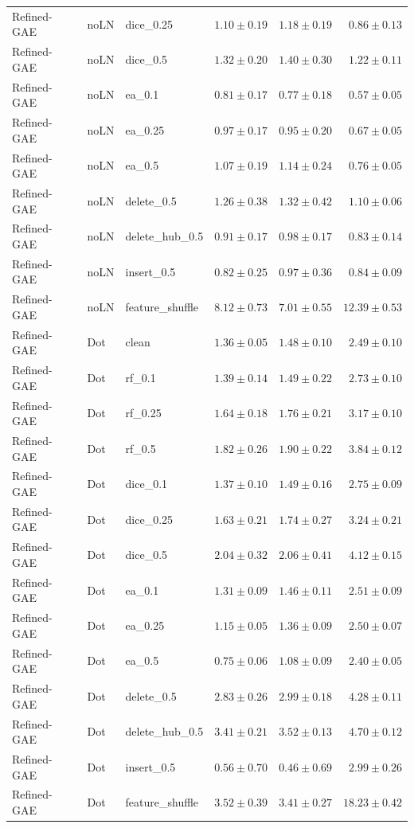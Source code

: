 \documentclass[UTF8,a4paper,11pt,fontset=fandol]{ctexart}
\begin{document}
{\begin{longtable}{lllrrr}
Refined-GAE & noLN & dice\_0.25 & $1.10\pm0.19$ & $1.18\pm0.19$ & $0.86\pm0.13$ \\
Refined-GAE & noLN & dice\_0.5 & $1.32\pm0.20$ & $1.40\pm0.30$ & $1.22\pm0.11$ \\
Refined-GAE & noLN & ea\_0.1 & $0.81\pm0.17$ & $0.77\pm0.18$ & $0.57\pm0.05$ \\
Refined-GAE & noLN & ea\_0.25 & $0.97\pm0.17$ & $0.95\pm0.20$ & $0.67\pm0.05$ \\
Refined-GAE & noLN & ea\_0.5 & $1.07\pm0.19$ & $1.14\pm0.24$ & $0.76\pm0.05$ \\
Refined-GAE & noLN & delete\_0.5 & $1.26\pm0.38$ & $1.32\pm0.42$ & $1.10\pm0.06$ \\
Refined-GAE & noLN & delete\_hub\_0.5 & $0.91\pm0.17$ & $0.98\pm0.17$ & $0.83\pm0.14$ \\
Refined-GAE & noLN & insert\_0.5 & $0.82\pm0.25$ & $0.97\pm0.36$ & $0.84\pm0.09$ \\
Refined-GAE & noLN & feature\_shuffle & $8.12\pm0.73$ & $7.01\pm0.55$ & $12.39\pm0.53$ \\
Refined-GAE & Dot & clean & $1.36\pm0.05$ & $1.48\pm0.10$ & $2.49\pm0.10$ \\
Refined-GAE & Dot & rf\_0.1 & $1.39\pm0.14$ & $1.49\pm0.22$ & $2.73\pm0.10$ \\
Refined-GAE & Dot & rf\_0.25 & $1.64\pm0.18$ & $1.76\pm0.21$ & $3.17\pm0.10$ \\
Refined-GAE & Dot & rf\_0.5 & $1.82\pm0.26$ & $1.90\pm0.22$ & $3.84\pm0.12$ \\
Refined-GAE & Dot & dice\_0.1 & $1.37\pm0.10$ & $1.49\pm0.16$ & $2.75\pm0.09$ \\
Refined-GAE & Dot & dice\_0.25 & $1.63\pm0.21$ & $1.74\pm0.27$ & $3.24\pm0.21$ \\
Refined-GAE & Dot & dice\_0.5 & $2.04\pm0.32$ & $2.06\pm0.41$ & $4.12\pm0.15$ \\
Refined-GAE & Dot & ea\_0.1 & $1.31\pm0.09$ & $1.46\pm0.11$ & $2.51\pm0.09$ \\
Refined-GAE & Dot & ea\_0.25 & $1.15\pm0.05$ & $1.36\pm0.09$ & $2.50\pm0.07$ \\
Refined-GAE & Dot & ea\_0.5 & $0.75\pm0.06$ & $1.08\pm0.09$ & $2.40\pm0.05$ \\
Refined-GAE & Dot & delete\_0.5 & $2.83\pm0.26$ & $2.99\pm0.18$ & $4.28\pm0.11$ \\
Refined-GAE & Dot & delete\_hub\_0.5 & $3.41\pm0.21$ & $3.52\pm0.13$ & $4.70\pm0.12$ \\
Refined-GAE & Dot & insert\_0.5 & $0.56\pm0.70$ & $0.46\pm0.69$ & $2.99\pm0.26$ \\
Refined-GAE & Dot & feature\_shuffle & $3.52\pm0.39$ & $3.41\pm0.27$ & $18.23\pm0.42$ \\
\end{longtable}
}
\end{document}
